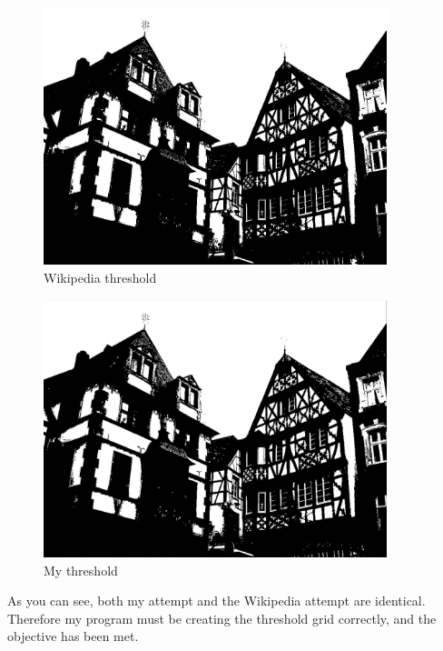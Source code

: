 \documentclass[titlepage]{article}
\begin{document}
\begin{figure}[H]
  \centering
  \includegraphics[width=10cm]{correct.jpg}
  \caption{Wikipedia threshold}
  \label{fig:dijk}
\end{figure}

\begin{figure}[H]
  \centering
  \includegraphics[width=10cm]{mine.png}
  \caption{My threshold}
  \label{fig:dijk}
\end{figure}

As you can see, both my attempt and the Wikipedia attempt are identical. Therefore my program must be creating the threshold grid correctly, and the objective has been met.
\end{document}
